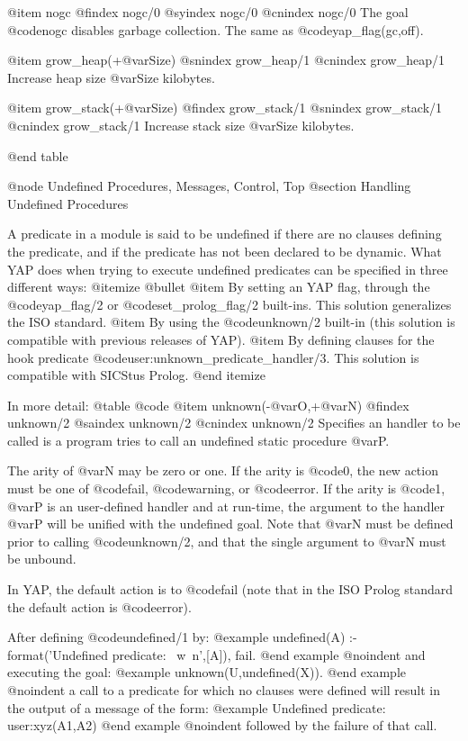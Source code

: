{{{{@item nogc
@findex nogc/0
@syindex nogc/0
@cnindex nogc/0
The goal @code{nogc} disables garbage collection. The same as
@code{yap_flag(gc,off)}.

@item grow_heap(+@var{Size})
@snindex grow_heap/1
@cnindex grow_heap/1
Increase heap size @var{Size} kilobytes.

@item grow_stack(+@var{Size})
@findex grow_stack/1
@snindex grow_stack/1
@cnindex grow_stack/1
Increase stack size @var{Size} kilobytes.

@end table

@node Undefined Procedures, Messages, Control, Top
@section Handling Undefined Procedures

A predicate in a module is said to be undefined if there are no clauses
defining the predicate, and if the predicate has not been declared to be
dynamic. What YAP does when trying to execute undefined predicates can
be specified in three different ways:
@itemize @bullet
@item By setting an YAP flag, through the @code{yap_flag/2} or
@code{set_prolog_flag/2} built-ins. This solution generalizes the
ISO standard.
@item By using the @code{unknown/2} built-in (this solution is
compatible with previous releases of YAP).
@item By defining clauses for the hook predicate
@code{user:unknown_predicate_handler/3}. This solution is compatible
with SICStus Prolog.
@end itemize

In more detail:
@table @code
@item unknown(-@var{O},+@var{N})
@findex unknown/2
@saindex unknown/2
@cnindex unknown/2
Specifies an handler to be called is a program tries to call an
undefined static procedure @var{P}.

The arity of @var{N} may be zero or one. If the arity is @code{0}, the
new action must be one of @code{fail}, @code{warning}, or
@code{error}. If the arity is @code{1}, @var{P} is an user-defined
handler and at run-time, the argument to the handler @var{P} will be
unified with the undefined goal. Note that @var{N} must be defined prior
to calling @code{unknown/2}, and that the single argument to @var{N} must
be unbound.

In YAP, the default action is to @code{fail} (note that in the ISO
Prolog standard the default action is @code{error}).

After defining @code{undefined/1} by:
@example
undefined(A) :- format('Undefined predicate: ~w~n',[A]), fail.
@end example
@noindent
and executing the goal:
@example
unknown(U,undefined(X)).
@end example
@noindent
a call to a predicate for which no clauses were defined will result in
the output of a message of the form:
@example
Undefined predicate: user:xyz(A1,A2)
@end example
@noindent
followed by the failure of that call.

}}}}
